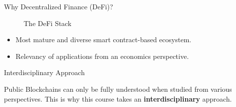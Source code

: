 \documentclass[handout]{beamer}
\begin{document}

\begin{frame}{Why Decentralized Finance (DeFi)?}

\begin{figure}[t]
	\centering	
	\resizebox{0.8\textwidth}{!}{
	\begin{tikzpicture}[scale=1.0, every node/.style={scale=1.0}]
			
	\end{tikzpicture}}
	\caption{The DeFi Stack \cite{FS:21}}
\end{figure}

\vspace{-1.0em}

\begin{itemize}
	\item Most mature and diverse smart contract-based ecosystem.
	\item Relevancy of applications from an economics perspective.
\end{itemize}

\end{frame}

\begin{frame}{Interdisciplinary Approach}

	\vspace{1em}
Public Blockchains can only be fully understood when studied from various perspectives. This is why this course takes an \color{focus} \textbf{interdisciplinary} \color{black} approach.	


\end{frame}
\end{document}
